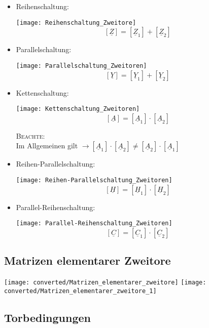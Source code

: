 \begin{mdframed}[style=exercise]
\begin{itemize}
    \item Reihenschaltung:
        \begin{center}
            \texttt{[image: Reihenschaltung\_Zweitore]}
        \[
            \left[ \underline{Z} \right] = \left[ \underline{Z}_1 \right] + \left[ \underline{Z}_2 \right]
        \]
        \end{center}
    \item Parallelschaltung:
        \begin{center}
            \texttt{[image: Parallelschaltung\_Zweitoren]}
        \[
            \left[ \underline{Y} \right] = \left[ \underline{Y}_1 \right] + \left[ \underline{Y}_2 \right]
        \]
        \end{center}
    \item Kettenschaltung:
        \begin{center}
            \texttt{[image: Kettenschaltung\_Zweitoren]}
        \[
            \left[ \underline{A} \right] = \left[ \underline{A}_1 \right] \cdot \left[ \underline{A}_2 \right]
        \]
        \end{center}
        \footnotesize
        \textsc{Beachte:}\\
        \normalsize Im Allgemeinen gilt $\rightarrow
        \left[ \underline{A}_1 \right] \cdot \left[
        \underline{A}_2 \right] \neq \left[ \underline{A}_2
        \right] \cdot \left[ \underline{A}_1 \right]$
    \item Reihen-Parallelschaltung:
        \begin{center}
            \texttt{[image: Reihen-Parallelschaltung\_Zweitoren]}
        \[
            \left[ \underline{H} \right] = \left[ \underline{H}_1 \right] \cdot \left[ \underline{H}_2 \right]
        \]
        \end{center}
    \item Parallel-Reihenschaltung:
        \begin{center}
            \texttt{[image: Parallel-Reihenschaltung\_Zweitoren]}
        \[
            \left[ \underline{C} \right] = \left[ \underline{C}_1 \right] \cdot \left[ \underline{C}_2 \right]
        \]
        \end{center}
\end{itemize}
\end{mdframed}


\begin{samepage}
    \onecolumn
    \subsection{Matrizen elementarer Zweitore}
    \texttt{[image: converted/Matrizen\_elementarer\_zweitore]}
    \texttt{[image: converted/Matrizen\_elementarer\_zweitore\_1]}
\end{samepage}
\twocolumn

\subsection{Torbedingungen}
